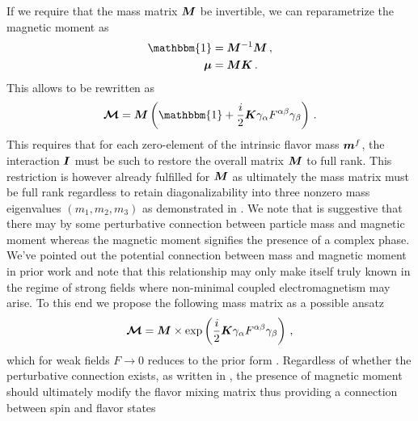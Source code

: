 If we require that the mass matrix $\boldsymbol{M}$ be invertible, we can reparametrize the magnetic moment as 
\begin{alignat}{1}
	\label{mass:eq:07a}  \mathbbm{1} &= \bb{M}^{-1}\bb{M}\,,\\
	\label{mass:eq:07b} \bb{\mu} &= \bb{M}\bb{K}\,.
\end{alignat}
This allows  to be rewritten as
\begin{alignat}{1}
	\label{mass:eq:08} {\bb{\mathcal{M}}} = \bb{M}\left(\mathbbm{1} + \frac{i}{2}\bb{K}\gamma_{\alpha}F^{\alpha\beta}\gamma_{\beta}\right)\,.
\end{alignat}
This requires that for each zero-element of the intrinsic flavor mass $\boldsymbol{m}^{f}$, the interaction $\boldsymbol{I}$ must be such to restore the overall matrix $\boldsymbol{M}$ to full rank. This restriction is however already fulfilled for $\boldsymbol{M}$ as ultimately the mass matrix must be full rank regardless to retain diagonalizability into three nonzero mass eigenvalues $(m_{1}, m_{2}, m_{3})$ as demonstrated in . We note that  is suggestive that there may by some perturbative connection between particle mass and magnetic moment whereas the magnetic moment signifies the presence of a complex phase. We've pointed out the potential connection between mass and magnetic moment in prior work and note that this relationship may only make itself truly known in the regime of strong fields where non-minimal coupled electromagnetism may arise. To this end we propose the following mass matrix as a possible ansatz
\begin{alignat}{1}
	\label{mass:eq:10} {\boldsymbol{\mathcal{M}}} = \boldsymbol{M}\times\mathrm{exp}\left(\frac{i}{2}\boldsymbol{K}\gamma_{\alpha}F^{\alpha\beta}\gamma_{\beta}\right)\,,
\end{alignat}
which for weak fields $F\rightarrow0$ reduces to the prior form . Regardless of whether the perturbative connection exists, as written in , the presence of magnetic moment should ultimately modify the flavor mixing matrix thus providing a connection between spin and flavor states
